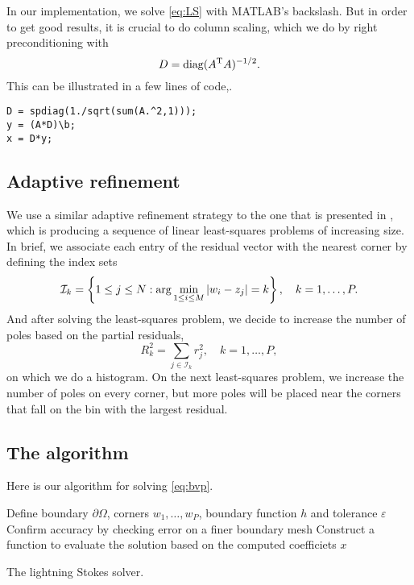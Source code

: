 In our implementation, we solve \eqref{eq:LS} with MATLAB's backslash. But in order to get good results, it is crucial to do column scaling, which we do by right preconditioning with
\begin{equation}
D=\operatorname{diag}( A^{\text{T}} A)^{-1/2}.
\end{equation} 
This can be illustrated in a few lines of code,.
\begin{verbatim}
D = spdiag(1./sqrt(sum(A.^2,1)));
y = (A*D)\b; 
x = D*y;
\end{verbatim}


\subsection{Adaptive refinement}
We use a similar adaptive refinement strategy to the one that is presented in \cite{Gopal19}, which is producing a sequence of linear least-squares problems of increasing size. In brief, we associate each entry of the residual vector with the nearest corner by defining the index sets
\begin{equation}
\mathcal{I}_k = \left\{1\leq j\leq N : \arg\min_{1\leq i \leq M} \abs{w_i-z_j}=k\right\},\quad k=1,\ldots, P.
\end{equation}
And after solving the least-squares problem, we decide to increase the number of poles based on the partial residuals, 
\begin{equation}
R_k^2 = \sum_{j\in \mathcal{I}_k} r_j^2,\quad k=1,\ldots, P,
\end{equation}
on which we do a histogram. On the next least-squares problem, we increase the number of poles on every corner, but more poles will be placed near the corners that fall on the bin with the largest residual.


\subsection{The algorithm}
Here is our algorithm for solving \eqref{eq:bvp}. 

\begin{algorithm}[H]
	\SetAlgoLined
	Define boundary $\partial \Omega$, corners $w_1,\ldots,w_P$, boundary function $h$ and tolerance $\varepsilon$\;
	Confirm accuracy by checking error on a finer boundary mesh\;
	Construct a function to evaluate the solution based on the computed coefficiets $x$\;
	\caption{The lightning Stokes solver.}
\end{algorithm}
